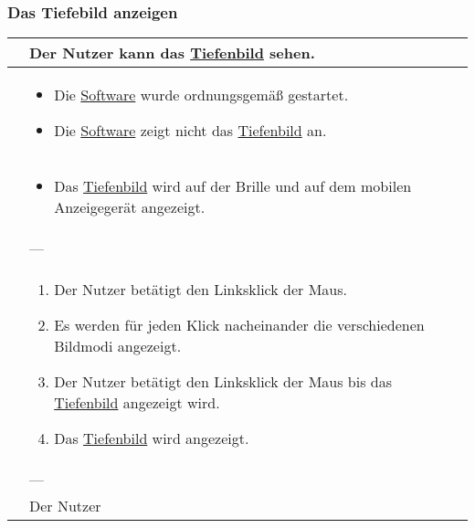 \subsubsection{Das Tiefebild anzeigen}
\begin{center}
	\begin{longtable}{| p{3cm} | p{12cm} |}
		\hline
		\goal & Der Nutzer kann das \hyperlink{tab:tiefe}{Tiefenbild} sehen. \\ \hline
		
		\precondition & \begin{itemize}
			\item Die \hyperlink{tab:anwendung}{Software} wurde ordnungsgemäß gestartet.
			\item Die \hyperlink{tab:anwendung}{Software} zeigt nicht das \hyperlink{tab:tiefe}{Tiefenbild} an.
		\end{itemize} \\ \hline
		
		\postcondition & \begin{itemize}
			\item Das \hyperlink{tab:tiefe}{Tiefenbild} wird auf der Brille und auf dem mobilen Anzeigegerät angezeigt.
		\end{itemize} \\ \hline
		
		\postexception & --- \\ \hline
		
		\flow & \begin{enumerate}
			\item Der Nutzer betätigt den Linksklick der Maus.
			\item Es werden für jeden Klick nacheinander die verschiedenen Bildmodi angezeigt.
			\item Der Nutzer betätigt den Linksklick der Maus bis das \hyperlink{tab:tiefe}{Tiefenbild} angezeigt wird.
			\item Das \hyperlink{tab:tiefe}{Tiefenbild} wird angezeigt.			
		\end{enumerate} \\ \hline
		
		\exception & --- \\ \hline
		
		\player & Der Nutzer \\
		\hline
	\end{longtable}
\end{center}

